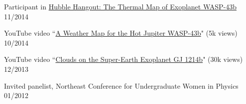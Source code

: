 \documentclass[12pt,letterpaper]{article}
\begin{document}
\begin{compactitem}[]
\item Participant in \href{https://www.youtube.com/watch?v=n-oDqYCf3XY}{Hubble Hangout: The Thermal Map of Exoplanet WASP-43b} \hfill 11/2014
\item YouTube video ``\href{https://www.youtube.com/watch?v=tQZqAVhUk9E}{A Weather Map for the Hot Jupiter WASP-43b}" (5k views) \hfill 10/2014
\item YouTube video ``\href{https://www.youtube.com/watch?v=8x2DcgZiKTA}{Clouds on the Super-Earth Exoplanet GJ 1214b}" (30k views) \hfill 12/2013
\item Invited panelist, Northeast Conference for Undergraduate Women in Physics \hfill 01/2012
\end{compactitem}
\end{document}
